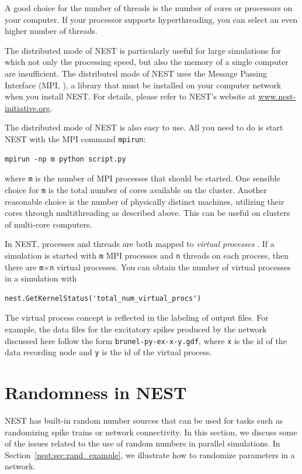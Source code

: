 \documentclass{article}
\begin{document}
A good choice for the number of threads is the number of cores or
processors on your computer. If your processor supports
hyperthreading, you can select an even higher number of threads.

The distributed mode of NEST is particularly useful for large simulations
for which not only the processing speed, but also the memory of a single
computer are insufficient.  The distributed mode of NEST uses the
Message Passing Interface (MPI, \citet{MPI2009}), a library that must be
installed on your computer network when you install NEST. For details,
please refer to NEST's website at \url{www.nest-initiative.org}.

The distributed mode of NEST is also easy to use. All you need to do
is start NEST with the MPI command \lstinline!mpirun!:
\begin{lstlisting}[numbers=none]
mpirun -np m python script.py
\end{lstlisting}
where \lstinline!m! is the number of MPI processes that should be
started. One sensible choice for \lstinline!m! is the total number of
cores available on the cluster. Another reasonable choice is the
number of physically distinct machines, utilizing their cores through
multithreading as described above. This can be useful on clusters of
multi-core computers. 

In NEST, processes and threads are both mapped to \emph{virtual
  processes} \citep{Ples:2007(672)}. If a
simulation is started with \lstinline!m! MPI processes and
\lstinline!n!  threads on each process, then there are
\lstinline!m!$\times$\lstinline!n!  virtual processes. You can obtain
the number of virtual processes in a simulation with
\begin{lstlisting}[numbers=none]
nest.GetKernelStatus('total_num_virtual_procs')
\end{lstlisting}

The virtual process concept is reflected in the labeling of output
files. For example, the data files for the excitatory spikes produced
by the network discussed here follow the form
\lstinline!brunel-py-ex-x-y.gdf!, where \lstinline!x! is the id of the
data recording node and \lstinline!y! is the id of the virtual
process.

\section{Randomness in NEST}\label{nest:sec:random}

NEST has built-in random number sources that can be used for tasks
such as randomizing spike trains or network connectivity. In this
section, we discuss some of the issues related to the use of random
numbers in parallel simulations. In
Section~\ref{nest:sec:rand_example}, we illustrate how to randomize
parameters in a network.
\end{document}
